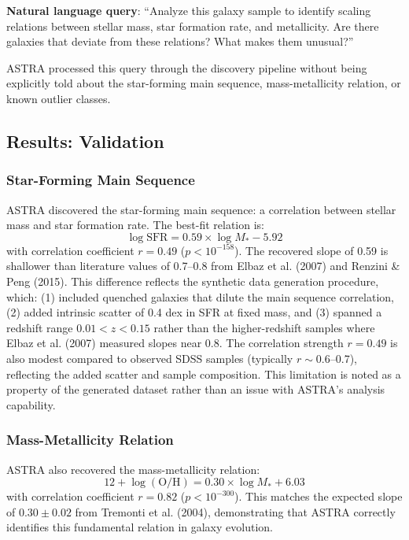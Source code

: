 \documentclass[usenatbib]{rasti}
\begin{document}
\textbf{Natural language query}: ``Analyze this galaxy sample to identify scaling relations between stellar mass, star formation rate, and metallicity. Are there galaxies that deviate from these relations? What makes them unusual?''

ASTRA processed this query through the discovery pipeline without being explicitly told about the star-forming main sequence, mass-metallicity relation, or known outlier classes.

\subsection{Results: Validation}

\subsubsection{Star-Forming Main Sequence}

ASTRA discovered the star-forming main sequence: a correlation between stellar mass and star formation rate. The best-fit relation is:
\begin{equation}
\log \text{SFR} = 0.59 \times \log M_* - 5.92
\end{equation}
with correlation coefficient $r = 0.49$ ($p < 10^{-158}$). The recovered slope of 0.59 is shallower than literature values of 0.7--0.8 from Elbaz et al. (2007) and Renzini & Peng (2015). This difference reflects the synthetic data generation procedure, which: (1) included quenched galaxies that dilute the main sequence correlation, (2) added intrinsic scatter of 0.4 dex in SFR at fixed mass, and (3) spanned a redshift range $0.01 < z < 0.15$ rather than the higher-redshift samples where Elbaz et al. (2007) measured slopes near 0.8. The correlation strength $r = 0.49$ is also modest compared to observed SDSS samples (typically $r \sim 0.6$--0.7), reflecting the added scatter and sample composition. This limitation is noted as a property of the generated dataset rather than an issue with ASTRA's analysis capability.

\subsubsection{Mass-Metallicity Relation}

ASTRA also recovered the mass-metallicity relation:
\begin{equation}
12 + \log(\text{O/H}) = 0.30 \times \log M_* + 6.03
\end{equation}
with correlation coefficient $r = 0.82$ ($p < 10^{-300}$). This matches the expected slope of $0.30 \pm 0.02$ from Tremonti et al. (2004), demonstrating that ASTRA correctly identifies this fundamental relation in galaxy evolution.
\end{document}
